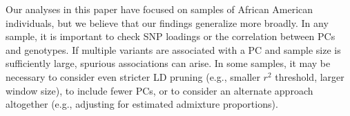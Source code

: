 \documentclass[12pt]{article}
\newcommand{\add}[1]{{\color{red}{[... #1 ...]}}}
\begin{document}
Our analyses in this paper have focused on samples of African American individuals, but we believe that our findings generalize more broadly.
In any sample, it is important to check SNP loadings or the correlation between PCs and genotypes.
If multiple variants are associated with a PC and sample size is sufficiently large, spurious associations can arise.  
In some samples, it may be necessary to consider even stricter LD pruning (e.g., smaller $r^2$ threshold, larger window size), to include fewer PCs, or to consider an alternate approach altogether (e.g., adjusting for estimated admixture proportions).

\end{document}
